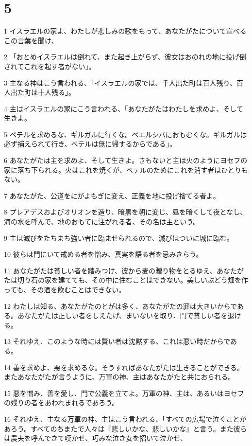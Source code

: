 \chapter{5}

\par 1 イスラエルの家よ、わたしが悲しみの歌をもって、あなたがたについて宣べるこの言葉を聞け、
\par 2 「おとめイスラエルは倒れて、また起き上がらず、彼女はおのれの地に投げ倒されてこれを起す者がない」。
\par 3 主なる神はこう言われる、「イスラエルの家では、千人出た町は百人残り、百人出た町は十人残る」。
\par 4 主はイスラエルの家にこう言われる、「あなたがたはわたしを求めよ、そして生きよ。
\par 5 ベテルを求めるな、ギルガルに行くな。ベエルシバにおもむくな。ギルガルは必ず捕えられて行き、ベテルは無に帰するからである」。
\par 6 あなたがたは主を求めよ、そして生きよ。さもないと主は火のようにヨセフの家に落ち下られる。火はこれを焼くが、ベテルのためにこれを消す者はひとりもない。
\par 7 あなたがた、公道をにがよもぎに変え、正義を地に投げ捨てる者よ。
\par 8 プレアデスおよびオリオンを造り、暗黒を朝に変じ、昼を暗くして夜となし、海の水を呼んで、地のおもてに注がれる者、その名は主という。
\par 9 主は滅びをたちまち強い者に臨ませられるので、滅びはついに城に臨む。
\par 10 彼らは門にいて戒める者を憎み、真実を語る者を忌みきらう。
\par 11 あなたがたは貧しい者を踏みつけ、彼から麦の贈り物をとるゆえ、あなたがたは切り石の家を建てても、その中に住むことはできない。美しいぶどう畑を作っても、その酒を飲むことはできない。
\par 12 わたしは知る、あなたがたのとがは多く、あなたがたの罪は大きいからである。あなたがたは正しい者をしえたげ、まいないを取り、門で貧しい者を退ける。
\par 13 それゆえ、このような時には賢い者は沈黙する、これは悪い時だからである。
\par 14 善を求めよ、悪を求めるな。そうすればあなたがたは生きることができる。またあなたがたが言うように、万軍の神、主はあなたがたと共におられる。
\par 15 悪を憎み、善を愛し、門で公義を立てよ。万軍の神、主は、あるいはヨセフの残りの者をあわれまれるであろう。
\par 16 それゆえ、主なる万軍の神、主はこう言われる、「すべての広場で泣くことがあろう。すべてのちまたで人々は『悲しいかな、悲しいかな』と言う。また彼らは農夫を呼んできて嘆かせ、巧みな泣き女を招いて泣かせ、
